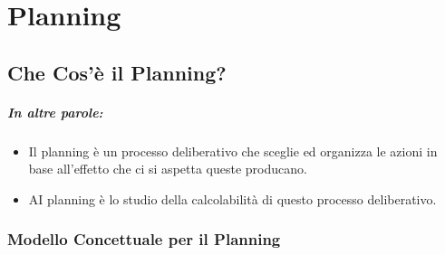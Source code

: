 \chapter{Planning}

\section{Che Cos'è il Planning?}



\paragraph{In altre parole:}

\begin{itemize}
  \item Il planning è un processo deliberativo che sceglie ed organizza le azioni in base
all’effetto che ci si aspetta queste producano. 
\item AI planning è lo studio della calcolabilità di questo processo deliberativo.
\end{itemize}

\subsection{Modello Concettuale per il Planning}





